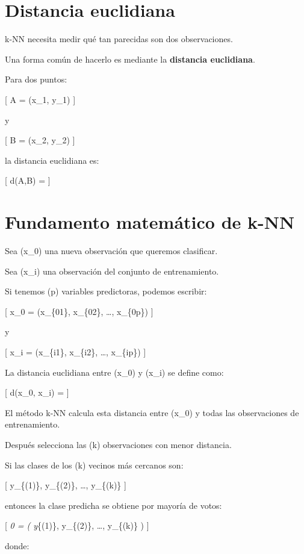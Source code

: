 \documentclass[
  11pt,
  letterpaper,
]{book}
\begin{document}
\section{Distancia euclidiana}\label{distancia-euclidiana}

k-NN necesita medir qué tan parecidas son dos observaciones.

Una forma común de hacerlo es mediante la \textbf{distancia euclidiana}.

Para dos puntos:

{[} A = (x\_1, y\_1) {]}

y

{[} B = (x\_2, y\_2) {]}

la distancia euclidiana es:

{[} d(A,B) =  {]}

\section{Fundamento matemático de
k-NN}\label{fundamento-matemuxe1tico-de-k-nn}

Sea (x\_0) una nueva observación que queremos clasificar.

Sea (x\_i) una observación del conjunto de entrenamiento.

Si tenemos (p) variables predictoras, podemos escribir:

{[} x\_0 = (x\_\{01\}, x\_\{02\}, \ldots, x\_\{0p\}) {]}

y

{[} x\_i = (x\_\{i1\}, x\_\{i2\}, \ldots, x\_\{ip\}) {]}

La distancia euclidiana entre (x\_0) y (x\_i) se define como:

{[} d(x\_0, x\_i) =  {]}

El método k-NN calcula esta distancia entre (x\_0) y todas las
observaciones de entrenamiento.

Después selecciona las (k) observaciones con menor distancia.

Si las clases de los (k) vecinos más cercanos son:

{[} y\_\{(1)\}, y\_\{(2)\}, \ldots, y\_\{(k)\} {]}

entonces la clase predicha se obtiene por mayoría de votos:

{[} \emph{0 =  \left( y}\{(1)\}, y\_\{(2)\},
\ldots, y\_\{(k)\} \right) {]}

donde:
\end{document}
